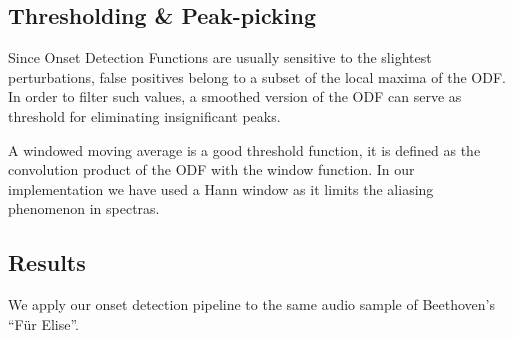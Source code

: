 \documentclass[
  american,
]{article}
\begin{document}
\hypertarget{thresholding-peak-picking}{%
\subsection{Thresholding \& Peak-picking}\label{thresholding-peak-picking}}

Since Onset Detection Functions are usually sensitive
to the slightest perturbations, false positives belong
to a subset of the local maxima of the ODF.
In order to filter such values, a smoothed version of the ODF
can serve as threshold for eliminating insignificant peaks.

A windowed moving average is a good threshold function,
it is defined as the convolution product of the ODF
with the window function.
In our implementation we have used a Hann window as it
limits the aliasing phenomenon in spectras.

\hypertarget{results}{%
\subsection{Results}\label{results}}

We apply our onset detection pipeline to the same
audio sample of Beethoven's ``Für Elise''.
\end{document}
